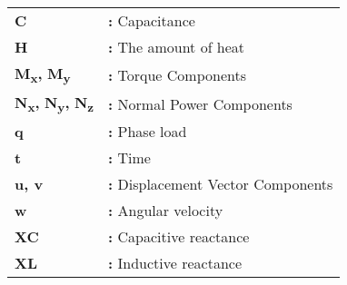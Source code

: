 \hspace{-3mm}
\begin{tabular}{p{2cm}l}
{\bf{C}} & {\bf:} Capacitance\\
{\bf H} & {\bf:} The amount of heat\\
{\bf M\textsubscript{x},} {\bf M\textsubscript{y}} & {\bf:} Torque Components\\
{\bf N\textsubscript{x},} {\bf N\textsubscript{y},} {\bf N\textsubscript{z}} & {\bf:} Normal Power Components\\
{\bf q} & {\bf:} Phase load\\
{\bf t} & {\bf:} Time\\
{\bf u, v} & {\bf:} Displacement Vector Components\\
{\bf w} & {\bf:} Angular velocity\\
{\bf XC} & {\bf:} Capacitive reactance\\
{\bf XL} & {\bf:}  Inductive reactance\\
\end{tabular}

